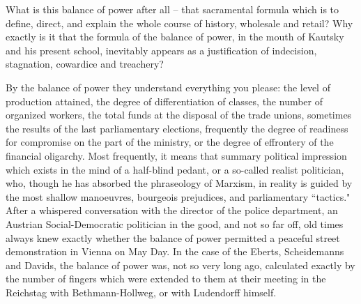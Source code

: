 \documentclass[12pt]{article}
\begin{document}
\vspace{12pt}
What is this balance of power after all -- that sacramental formula
which is to define, direct, and explain the whole course of history,
wholesale and retail? Why exactly is it that the formula of the
balance of power, in the mouth of Kautsky and his present school,
inevitably appears as a justification of indecision, stagnation,
cowardice and treachery?

\vspace{12pt}
By the balance of power they understand everything you please: the
level of production attained, the degree of differentiation of
classes, the number of organized workers, the total funds at the
disposal of the trade unions, sometimes the results of the last
parliamentary elections, frequently the degree of readiness for
compromise on the part of the ministry, or the degree of effrontery of
the financial oligarchy. Most frequently, it means that summary
political impression which exists in the mind of a half-blind pedant,
or a so-called realist politician, who, though he has absorbed the
phraseology of Marxism, in reality is guided by the most shallow
manoeuvres, bourgeois prejudices, and parliamentary ``tactics." After
a whispered conversation with the director of the police department,
an Austrian Social-Democratic politician in the good, and not so far
off, old times always knew exactly whether the balance of power
permitted a peaceful street demonstration in Vienna on May Day. In the
case of the Eberts, Scheidemanns and Davids, the balance of power was,
not so very long ago, calculated exactly by the number of fingers
which were extended to them at their meeting in the Reichstag with
Bethmann-Hollweg, or with Ludendorff himself.
\end{document}
